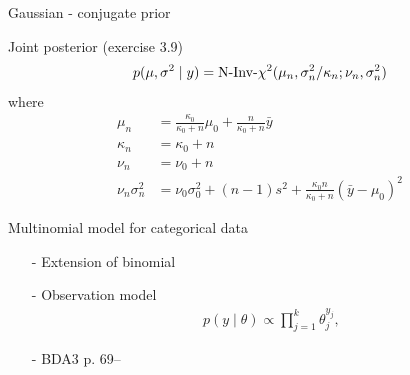 \documentclass[10pt,handout]{beamer}
\begin{document}
\begin{frame}{Gaussian - conjugate prior}

  Joint posterior (exercise 3.9)
    \begin{align*}
      p(\mu,\sigma^2 \mid y)=\NInvchi2(\mu_n,\sigma_n^2/\kappa_n;\nu_n,\sigma_n^2)
    \end{align*}
    where
    \begin{align*}
      \mu_n & = \frac{\kappa_0}{\kappa_0+n}\mu_0 + \frac{n}{\kappa_0+n}\bar{y} \\
      \kappa_n & = \kappa_0+n \\
      \nu_n & = \nu_0+n \\
      \nu_n\sigma_n^2 & =\nu_0\sigma_0^2 + (n-1)s^2 +
      \frac{\kappa_0 n}{\kappa_0+n}(\bar{y}-\mu_0)^2
    \end{align*}

\end{frame}





\begin{frame}{Multinomial model for categorical data}

  \begin{itemize}
  \item[-] Extension of binomial
  \item[-] Observation model
    \begin{align*}
      p(y  \mid  \theta) \propto \prod_{j=1}^k \theta_j^{y_j},
    \end{align*}
  \item[-] BDA3 p. 69--
  \end{itemize}

\end{frame}
\end{document}

